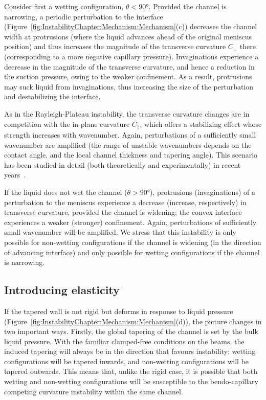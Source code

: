 Consider first a wetting configuration, $\theta < 90$\si{\degree}. Provided the channel is narrowing, a periodic perturbation to the interface (Figure~\ref{fig:InstabilityChapter:Mechanism:Mechanism}(c)) decreases the channel width at protrusions (where the liquid advances ahead of the original meniscus position) and thus increases the magnitude of the transverse curvature  $C_{\perp}$ there (corresponding to a more negative capillary pressure). Invaginations experience a decrease in the magnitude of the transverse curvature, and hence a reduction in the suction pressure, owing to the weaker confinement. As a result, protrusions may suck liquid from invaginations, thus increasing the size of the perturbation and destabilizing the interface.

As in the Rayleigh-Plateau instability, the transverse curvature changes are in competition with the in-plane curvature $C_{\parallel}$, which offers a stabilizing effect whose strength increases with wavenumber. Again, perturbations of a sufficiently small wavenumber are amplified (the range of unstable wavenumbers depends on the contact angle, and the local channel thickness and tapering angle). This scenario has been studied in detail (both theoretically and experimentally) in recent years~\cite[see][for example]{Protiere2010EPL, AlHousseiny2012NaturePhysics,AlHousseiny2013PhysFlu,Keiser2016JFM, LedesmaAguilar2017SoftMatter}.

If the liquid does not wet the channel ($\theta> 90\si{\degree}$), protrusions (invaginations) of a perturbation to the meniscus experience a decrease (increase, respectively) in transverse curvature, provided the channel is widening; the convex interface experiences a weaker (stronger) confinement. Again, perturbations of sufficiently small wavenumber will be amplified. We stress that this instability is only possible for non-wetting configurations if the channel is widening (in the direction of advancing interface) and only possible for wetting configurations if the channel is narrowing.


\subsection{Introducing elasticity}\label{S:InstabilityChapter:Mechanism:Elasticity}
If the tapered wall is not rigid but deforms in response to liquid pressure (Figure~\ref{fig:InstabilityChapter:Mechanism:Mechanism}(d)), the picture changes in two important ways. Firstly, the global tapering of the channel is set by the bulk liquid pressure. With the familiar clamped-free conditions on the beams, the induced tapering will always be in the direction that favours instability: wetting configurations will be tapered inwards, and non-wetting configurations will be tapered outwards. This means that, unlike the rigid case, it is possible that both wetting and non-wetting configurations will be susceptible to the bendo-capillary competing curvature instability within the same channel.

